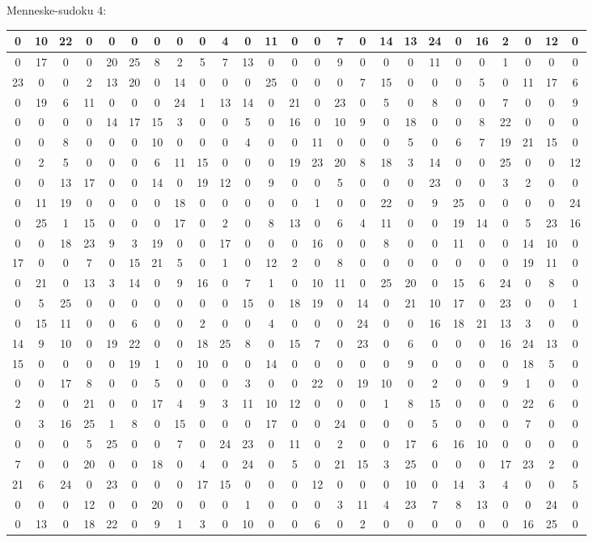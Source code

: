 \documentclass[]{report}
\begin{document}
Menneske-sudoku 4:\\
\begin{tabular}{|c|c|c|c|c||c|c|c|c|c||c|c|c|c|c||c|c|c|c|c||c|c|c|c|c|}
\hline
0&10&22&0&0&0&0&0&0&4&0&11&0&0&7&0&14&13&24&0&16&2&0&12&0\\\hline
0&17&0&0&20&25&8&2&5&7&13&0&0&0&9&0&0&0&11&0&0&1&0&0&0\\\hline
23&0&0&2&13&20&0&14&0&0&0&25&0&0&0&7&15&0&0&0&5&0&11&17&6\\\hline
0&19&6&11&0&0&0&24&1&13&14&0&21&0&23&0&5&0&8&0&0&7&0&0&9\\\hline
0&0&0&0&14&17&15&3&0&0&5&0&16&0&10&9&0&18&0&0&8&22&0&0&0\\\hline\hline
0&0&8&0&0&0&10&0&0&0&4&0&0&11&0&0&0&5&0&6&7&19&21&15&0\\\hline
0&2&5&0&0&0&6&11&15&0&0&0&19&23&20&8&18&3&14&0&0&25&0&0&12\\\hline
0&0&13&17&0&0&14&0&19&12&0&9&0&0&5&0&0&0&23&0&0&3&2&0&0\\\hline
0&11&19&0&0&0&0&18&0&0&0&0&0&1&0&0&22&0&9&25&0&0&0&0&24\\\hline
0&25&1&15&0&0&0&17&0&2&0&8&13&0&6&4&11&0&0&19&14&0&5&23&16\\\hline\hline
0&0&18&23&9&3&19&0&0&17&0&0&0&16&0&0&8&0&0&11&0&0&14&10&0\\\hline
17&0&0&7&0&15&21&5&0&1&0&12&2&0&8&0&0&0&0&0&0&0&19&11&0\\\hline
0&21&0&13&3&14&0&9&16&0&7&1&0&10&11&0&25&20&0&15&6&24&0&8&0\\\hline
0&5&25&0&0&0&0&0&0&0&15&0&18&19&0&14&0&21&10&17&0&23&0&0&1\\\hline
0&15&11&0&0&6&0&0&2&0&0&4&0&0&0&24&0&0&16&18&21&13&3&0&0\\\hline\hline
14&9&10&0&19&22&0&0&18&25&8&0&15&7&0&23&0&6&0&0&0&16&24&13&0\\\hline
15&0&0&0&0&19&1&0&10&0&0&14&0&0&0&0&0&9&0&0&0&0&18&5&0\\\hline
0&0&17&8&0&0&5&0&0&0&3&0&0&22&0&19&10&0&2&0&0&9&1&0&0\\\hline
2&0&0&21&0&0&17&4&9&3&11&10&12&0&0&0&1&8&15&0&0&0&22&6&0\\\hline
0&3&16&25&1&8&0&15&0&0&0&17&0&0&24&0&0&0&5&0&0&0&7&0&0\\\hline\hline
0&0&0&5&25&0&0&7&0&24&23&0&11&0&2&0&0&17&6&16&10&0&0&0&0\\\hline
7&0&0&20&0&0&18&0&4&0&24&0&5&0&21&15&3&25&0&0&0&17&23&2&0\\\hline
21&6&24&0&23&0&0&0&17&15&0&0&0&12&0&0&0&10&0&14&3&4&0&0&5\\\hline
0&0&0&12&0&0&20&0&0&0&1&0&0&0&3&11&4&23&7&8&13&0&0&24&0\\\hline
0&13&0&18&22&0&9&1&3&0&10&0&0&6&0&2&0&0&0&0&0&0&16&25&0\\\hline
\end{tabular}
\end{document}
